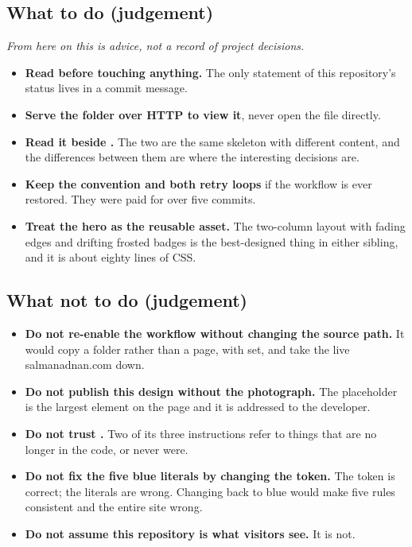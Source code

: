 \documentclass[11pt,a4paper]{article}
\begin{document}
\subsection{What to do (judgement)}

\emph{From here on this is advice, not a record of project decisions.}

\begin{itemize}
\item \textbf{Read  before touching anything.} The only statement of
  this repository's status lives in a commit message.
\item \textbf{Serve the folder over HTTP to view it}, never open the file directly.
\item \textbf{Read it beside .} The two are the same skeleton
  with different content, and the differences between them are where the
  interesting decisions are.
\item \textbf{Keep the \code{[deploy]} convention and both retry loops} if the
  workflow is ever restored. They were paid for over five commits.
\item \textbf{Treat the hero as the reusable asset.} The two-column layout with
  fading edges and drifting frosted badges is the best-designed thing in either
  sibling, and it is about eighty lines of CSS.
\end{itemize}

\subsection{What not to do (judgement)}

\begin{itemize}
\item \textbf{Do not re-enable the workflow without changing the 
  source path.} It would copy a folder rather than a page, with 
  set, and take the live salmanadnan.com down.
\item \textbf{Do not publish this design without the photograph.} The placeholder
  is the largest element on the page and it is addressed to the developer.
\item \textbf{Do not trust .} Two of its three instructions refer
  to things that are no longer in the code, or never were.
\item \textbf{Do not fix the five blue literals by changing the token.} The token
  is correct; the literals are wrong. Changing  back to blue would
  make five rules consistent and the entire site wrong.
\item \textbf{Do not assume this repository is what visitors see.} It is not.
\end{itemize}
\end{document}
